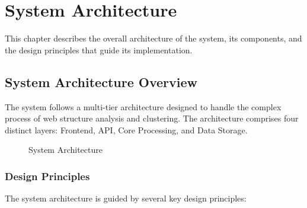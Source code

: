\chapter{System Architecture}
\label{chap:architecture}

This chapter describes the overall architecture of the {\name} system, its components, and the design principles that guide its implementation.

\section{System Architecture Overview}
\label{sec:architecture_overview}

The {\name} system follows a multi-tier architecture designed to handle the complex process of web structure analysis and clustering. The architecture comprises four distinct layers: Frontend, API, Core Processing, and Data Storage.

\begin{figure}[h]
\centering
{}
\caption{{\name} System Architecture}
\label{fig:system_architecture}
\end{figure}

\subsection{Design Principles}

The system architecture is guided by several key design principles:

